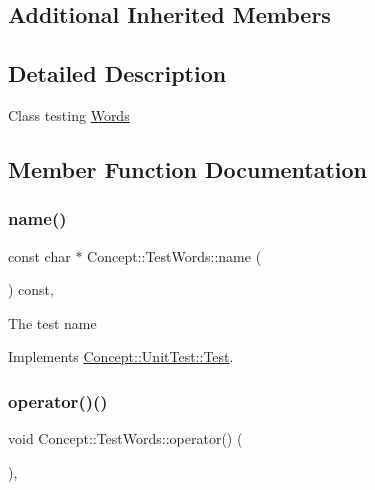 \subsection*{Additional Inherited Members}


\subsection{Detailed Description}
Class testing \mbox{\hyperlink{class_concept_1_1_words}{Words}} 

\subsection{Member Function Documentation}
\mbox{\label{class_concept_1_1_test_words_a1466d72428143b610937c692545de6f3}} 
\subsubsection{\texorpdfstring{name()}{name()}}
{\footnotesize\ttfamily const char $\ast$ Concept\+::\+Test\+Words\+::name (\begin{DoxyParamCaption}{ }\end{DoxyParamCaption}) const\hspace{0.3cm}{\ttfamily [override]}, {\ttfamily [virtual]}}

The test name 

Implements \mbox{\hyperlink{class_concept_1_1_unit_test_1_1_test_a28c0cddd9719cd456fa92a142ae6c59d}{Concept\+::\+Unit\+Test\+::\+Test}}.

\mbox{\label{class_concept_1_1_test_words_ac268229701b31e0aab5764227b9cdf0b}} 
\subsubsection{\texorpdfstring{operator()()}{operator()()}}
{\footnotesize\ttfamily void Concept\+::\+Test\+Words\+::operator() (\begin{DoxyParamCaption}{ }\end{DoxyParamCaption})\hspace{0.3cm}{\ttfamily [override]}, {\ttfamily [virtual]}}

